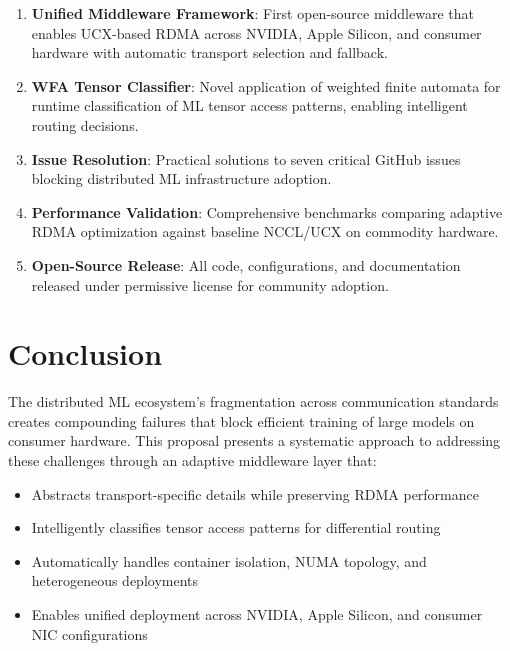 \documentclass[11pt,letterpaper]{article}
\theoremstyle{definition}
\begin{document}
\begin{enumerate}
    \item \textbf{Unified Middleware Framework}: First open-source middleware that enables UCX-based RDMA across NVIDIA, Apple Silicon, and consumer hardware with automatic transport selection and fallback.
    
    \item \textbf{WFA Tensor Classifier}: Novel application of weighted finite automata for runtime classification of ML tensor access patterns, enabling intelligent routing decisions.
    
    \item \textbf{Issue Resolution}: Practical solutions to seven critical GitHub issues blocking distributed ML infrastructure adoption.
    
    \item \textbf{Performance Validation}: Comprehensive benchmarks comparing adaptive RDMA optimization against baseline NCCL/UCX on commodity hardware.
    
    \item \textbf{Open-Source Release}: All code, configurations, and documentation released under permissive license for community adoption.
\end{enumerate}

\section{Conclusion}

The distributed ML ecosystem's fragmentation across communication standards creates compounding failures that block efficient training of large models on consumer hardware. This proposal presents a systematic approach to addressing these challenges through an adaptive middleware layer that:

\begin{itemize}
    \item Abstracts transport-specific details while preserving RDMA performance
    \item Intelligently classifies tensor access patterns for differential routing
    \item Automatically handles container isolation, NUMA topology, and heterogeneous deployments
    \item Enables unified deployment across NVIDIA, Apple Silicon, and consumer NIC configurations
\end{itemize}
\end{document}
